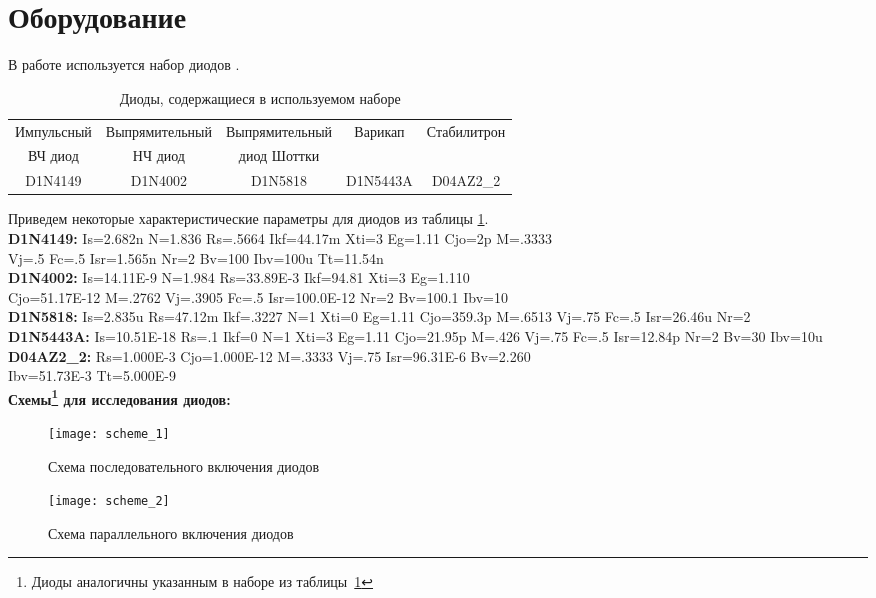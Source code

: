 \documentclass{semi}
\begin{document}

\section*{Оборудование}

В работе используется набор диодов .

\begin{table}[H]
	\centering
	\begin{tabular}{|ccccc|}
		\hline
		Импульсный	&Выпрямительный	&Выпрямительный	&Варикап	&Стабилитрон\\
		ВЧ диод		&НЧ диод		&диод Шоттки	&			&			\\ \hline
		D1N4149		&D1N4002		&D1N5818		&D1N5443A	&D04AZ2\_2	\\ \hline 
	\end{tabular}
	\caption{Диоды, содержащиеся в используемом наборе}
	\label{tab:diodes}
\end{table}

Приведем некоторые характеристические параметры для диодов из таблицы \ref{tab:diodes}.\\

\textbf{{\normalsize D1N4149:}}
Is=2.682n N=1.836 Rs=.5664 Ikf=44.17m Xti=3 Eg=1.11 Cjo=2p
M=.3333\\ Vj=.5 Fc=.5 Isr=1.565n Nr=2 Bv=100 Ibv=100u Tt=11.54n\\

\textbf{{\normalsize D1N4002:}}
Is=14.11E-9 N=1.984 Rs=33.89E-3 Ikf=94.81 Xti=3
Eg=1.110\\ Cjo=51.17E-12 M=.2762 Vj=.3905 Fc=.5 Isr=100.0E-12
Nr=2 Bv=100.1 Ibv=10\\

\textbf{{\normalsize D1N5818:}}
Is=2.835u Rs=47.12m Ikf=.3227 N=1 Xti=0 Eg=1.11 Cjo=359.3p
M=.6513 Vj=.75 Fc=.5 Isr=26.46u Nr=2\\

\textbf{{\normalsize D1N5443A:}}
Is=10.51E-18 Rs=.1 Ikf=0 N=1 Xti=3 Eg=1.11 Cjo=21.95p
M=.426 Vj=.75 Fc=.5 Isr=12.84p Nr=2 Bv=30 Ibv=10u\\

\textbf{{\normalsize D04AZ2\_2:}}
Rs=1.000E-3 Cjo=1.000E-12 M=.3333 Vj=.75 Isr=96.31E-6
Bv=2.260\\ Ibv=51.73E-3 Tt=5.000E-9\\

\textbf{{\normalsize Схемы\footnote{Диоды аналогичны указанным в наборе из таблицы~\ref{tab:diodes}} для исследования диодов:}}
\begin{figure}[H]
	\centering
	\texttt{[image: scheme\_1]}
	\caption{\footnotesize Схема последовательного включения диодов}
	\vspace{1cm}
	\texttt{[image: scheme\_2]}
	\caption{\footnotesize Схема параллельного включения диодов}
	\label{scheme}
\end{figure}
\end{document}
